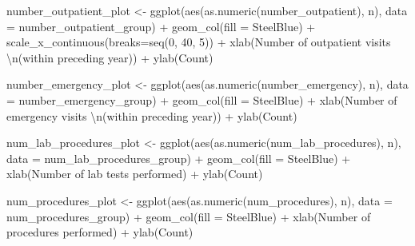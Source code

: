 \documentclass[
]{article}
\newenvironment{Shaded}{\begin{snugshade}}{\end{snugshade}}
\newcommand{\AttributeTok}[1]{\textcolor[rgb]{0.77,0.63,0.00}{#1}}
\newcommand{\DecValTok}[1]{\textcolor[rgb]{0.00,0.00,0.81}{#1}}
\newcommand{\FunctionTok}[1]{\textcolor[rgb]{0.00,0.00,0.00}{#1}}
\newcommand{\NormalTok}[1]{#1}
\newcommand{\OtherTok}[1]{\textcolor[rgb]{0.56,0.35,0.01}{#1}}
\newcommand{\SpecialCharTok}[1]{\textcolor[rgb]{0.00,0.00,0.00}{#1}}
\newcommand{\StringTok}[1]{\textcolor[rgb]{0.31,0.60,0.02}{#1}}
\begin{document}
\begin{Shaded}
\begin{Highlighting}[]
\NormalTok{number\_outpatient\_plot }\OtherTok{\textless{}{-}} 
  \FunctionTok{ggplot}\NormalTok{(}\FunctionTok{aes}\NormalTok{(}\FunctionTok{as.numeric}\NormalTok{(number\_outpatient), n), }\AttributeTok{data =}\NormalTok{ number\_outpatient\_group) }\SpecialCharTok{+}
  \FunctionTok{geom\_col}\NormalTok{(}\AttributeTok{fill =} \StringTok{\textquotesingle{}SteelBlue\textquotesingle{}}\NormalTok{) }\SpecialCharTok{+}
  \FunctionTok{scale\_x\_continuous}\NormalTok{(}\AttributeTok{breaks=}\FunctionTok{seq}\NormalTok{(}\DecValTok{0}\NormalTok{, }\DecValTok{40}\NormalTok{, }\DecValTok{5}\NormalTok{))  }\SpecialCharTok{+}
  \FunctionTok{xlab}\NormalTok{(}\StringTok{\textquotesingle{}Number of outpatient visits }\SpecialCharTok{\textbackslash{}n}\StringTok{(within preceding year)\textquotesingle{}}\NormalTok{) }\SpecialCharTok{+}
  \FunctionTok{ylab}\NormalTok{(}\StringTok{\textquotesingle{}Count\textquotesingle{}}\NormalTok{)}

\NormalTok{number\_emergency\_plot }\OtherTok{\textless{}{-}} 
  \FunctionTok{ggplot}\NormalTok{(}\FunctionTok{aes}\NormalTok{(}\FunctionTok{as.numeric}\NormalTok{(number\_emergency), n), }\AttributeTok{data =}\NormalTok{ number\_emergency\_group) }\SpecialCharTok{+}
  \FunctionTok{geom\_col}\NormalTok{(}\AttributeTok{fill =} \StringTok{\textquotesingle{}SteelBlue\textquotesingle{}}\NormalTok{) }\SpecialCharTok{+}
  \FunctionTok{xlab}\NormalTok{(}\StringTok{\textquotesingle{}Number of emergency visits }\SpecialCharTok{\textbackslash{}n}\StringTok{(within preceding year)\textquotesingle{}}\NormalTok{) }\SpecialCharTok{+}
  \FunctionTok{ylab}\NormalTok{(}\StringTok{\textquotesingle{}Count\textquotesingle{}}\NormalTok{)}

\NormalTok{num\_lab\_procedures\_plot }\OtherTok{\textless{}{-}} 
  \FunctionTok{ggplot}\NormalTok{(}\FunctionTok{aes}\NormalTok{(}\FunctionTok{as.numeric}\NormalTok{(num\_lab\_procedures), n), }\AttributeTok{data =}\NormalTok{ num\_lab\_procedures\_group) }\SpecialCharTok{+}
  \FunctionTok{geom\_col}\NormalTok{(}\AttributeTok{fill =} \StringTok{\textquotesingle{}SteelBlue\textquotesingle{}}\NormalTok{) }\SpecialCharTok{+}
  \FunctionTok{xlab}\NormalTok{(}\StringTok{\textquotesingle{}Number of lab tests performed\textquotesingle{}}\NormalTok{) }\SpecialCharTok{+}
  \FunctionTok{ylab}\NormalTok{(}\StringTok{\textquotesingle{}Count\textquotesingle{}}\NormalTok{)}

\NormalTok{num\_procedures\_plot }\OtherTok{\textless{}{-}} 
  \FunctionTok{ggplot}\NormalTok{(}\FunctionTok{aes}\NormalTok{(}\FunctionTok{as.numeric}\NormalTok{(num\_procedures), n), }\AttributeTok{data =}\NormalTok{ num\_procedures\_group) }\SpecialCharTok{+}
  \FunctionTok{geom\_col}\NormalTok{(}\AttributeTok{fill =} \StringTok{\textquotesingle{}SteelBlue\textquotesingle{}}\NormalTok{) }\SpecialCharTok{+}
  \FunctionTok{xlab}\NormalTok{(}\StringTok{\textquotesingle{}Number of procedures performed\textquotesingle{}}\NormalTok{) }\SpecialCharTok{+}
  \FunctionTok{ylab}\NormalTok{(}\StringTok{\textquotesingle{}Count\textquotesingle{}}\NormalTok{)}


\end{Highlighting}
\end{Shaded}
\end{document}
